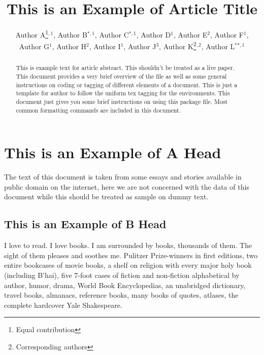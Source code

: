 \documentclass[final]{clv2025}
\begin{document}
\title{This is an Example of Article Title}

\author{Author A\thanks{Equal contribution}$^{,1}$, Author B$^{*,1}$, Author C$^{*,1}$, Author D$^{1}$, Author E$^{2}$, Author F$^{1}$, Author G$^{1}$, Author H$^{2}$, Author I$^{1}$, Author J$^{3}$, Author K\thanks{Corresponding authors}$^{,2}$, Author L$^{**,1}$}


\maketitle

\begin{abstract}
This is example text for article abstract. This shouldn't be treated as a live paper. This document provides a very brief overview of the file as well as some general instructions on coding or tagging of different elements of a document. This is just a template for author to follow the uniform tex tagging for the environments. This document just gives you some brief instructions on using this package file. Most common formatting commands are included in this document.
\end{abstract}

\section{This is an Example of A Head}

The text of this document is taken from some essays and stories available in public domain on the internet, here we are not concerned with the data of this document while this should be treated as sample on dummy text.

\subsection{This is an Example of B Head}

I love to read. I love books. I am surrounded by books, thousands of them. The sight of them pleases and soothes me. Pulitzer Prize-winners in first editions, two entire bookcases of movie books, a shelf on religion with every major holy book (including B'hai), five 7-foot cases of fiction and non-fiction alphabetical by author, humor, drama, World Book Encyclopedias, an unabridged dictionary, travel books, almanacs, reference books, many books of quotes, atlases, the complete hardcover Yale Shakespeare.
\end{document}
